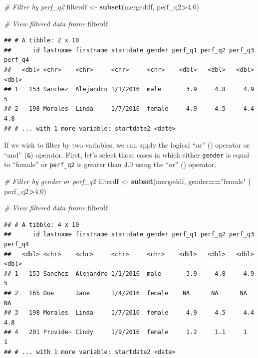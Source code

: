 \documentclass[]{book}
\newenvironment{Shaded}{\begin{snugshade}}{\end{snugshade}}
\newcommand{\KeywordTok}[1]{\textcolor[rgb]{0.13,0.29,0.53}{\textbf{#1}}}
\newcommand{\FloatTok}[1]{\textcolor[rgb]{0.00,0.00,0.81}{#1}}
\newcommand{\StringTok}[1]{\textcolor[rgb]{0.31,0.60,0.02}{#1}}
\newcommand{\CommentTok}[1]{\textcolor[rgb]{0.56,0.35,0.01}{\textit{#1}}}
\newcommand{\OperatorTok}[1]{\textcolor[rgb]{0.81,0.36,0.00}{\textbf{#1}}}
\newcommand{\NormalTok}[1]{#1}
\begin{document}
\begin{Shaded}
\begin{Highlighting}[]
\CommentTok{# Filter by perf_q2}
\NormalTok{filterdf <-}\StringTok{ }\KeywordTok{subset}\NormalTok{(mergeddf, perf_q2}\OperatorTok{>}\FloatTok{4.0}\NormalTok{)}

\CommentTok{# View filtered data frame}
\NormalTok{filterdf}
\end{Highlighting}
\end{Shaded}

\begin{verbatim}
## # A tibble: 2 x 10
##      id lastname firstname startdate gender perf_q1 perf_q2 perf_q3 perf_q4
##   <dbl> <chr>    <chr>     <chr>     <chr>    <dbl>   <dbl>   <dbl>   <dbl>
## 1   153 Sanchez  Alejandro 1/1/2016  male       3.9     4.8     4.9     5  
## 2   198 Morales  Linda     1/7/2016  female     4.9     4.5     4.4     4.8
## # ... with 1 more variable: startdate2 <date>
\end{verbatim}

If we wish to filter by two variables, we can apply the logical ``or''
(\texttt{\textbar{}}) operator or ``and'' (\texttt{\&}) operator. First,
let's select those cases in which either \texttt{gender} is equal to
``female'' or \texttt{perf\_q2} is greater than 4.0 using the ``or''
(\texttt{\textbar{}}) operator.

\begin{Shaded}
\begin{Highlighting}[]
\CommentTok{# Filter by gender or perf_q2}
\NormalTok{filterdf <-}\StringTok{ }\KeywordTok{subset}\NormalTok{(mergeddf, gender}\OperatorTok{==}\StringTok{"female"} \OperatorTok{|}\StringTok{ }\NormalTok{perf_q2}\OperatorTok{>}\FloatTok{4.0}\NormalTok{)}

\CommentTok{# View filtered data frame}
\NormalTok{filterdf}
\end{Highlighting}
\end{Shaded}

\begin{verbatim}
## # A tibble: 4 x 10
##      id lastname firstname startdate gender perf_q1 perf_q2 perf_q3 perf_q4
##   <dbl> <chr>    <chr>     <chr>     <chr>    <dbl>   <dbl>   <dbl>   <dbl>
## 1   153 Sanchez  Alejandro 1/1/2016  male       3.9     4.8     4.9     5  
## 2   165 Doe      Jane      1/4/2016  female    NA      NA      NA      NA  
## 3   198 Morales  Linda     1/7/2016  female     4.9     4.5     4.4     4.8
## 4   201 Provide~ Cindy     1/9/2016  female     1.2     1.1     1       1  
## # ... with 1 more variable: startdate2 <date>
\end{verbatim}
\end{document}
